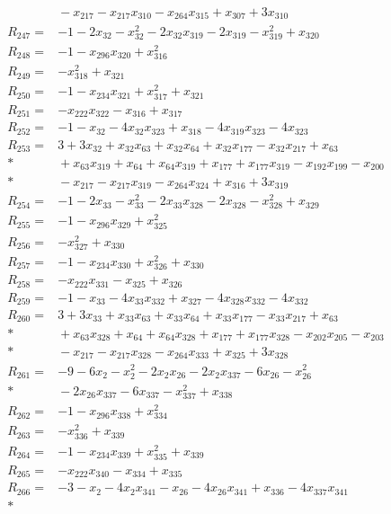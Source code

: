 \begin{align*}
&{}-x_{217}-x_{217}x_{310}-x_{264}x_{315}+x_{307}+3x_{310}\\[3pt]
R_{247}={}&-1-2x_{32}-x_{32}^{2}-2x_{32}x_{319}-2x_{319}-x_{319}^{2}+x_{320}\\[3pt]
R_{248}={}&-1-x_{296}x_{320}+x_{316}^{2}\\[3pt]
R_{249}={}&-x_{318}^{2}+x_{321}\\[3pt]
R_{250}={}&-1-x_{234}x_{321}+x_{317}^{2}+x_{321}\\[3pt]
R_{251}={}&-x_{222}x_{322}-x_{316}+x_{317}\\[3pt]
R_{252}={}&-1-x_{32}-4x_{32}x_{323}+x_{318}-4x_{319}x_{323}-4x_{323}\\[3pt]
R_{253}={}&3+3x_{32}+x_{32}x_{63}+x_{32}x_{64}+x_{32}x_{177}-x_{32}x_{217}+x_{63}\\*
&{}+x_{63}x_{319}+x_{64}+x_{64}x_{319}+x_{177}+x_{177}x_{319}-x_{192}x_{199}-x_{200}\\*
&{}-x_{217}-x_{217}x_{319}-x_{264}x_{324}+x_{316}+3x_{319}\\[3pt]
R_{254}={}&-1-2x_{33}-x_{33}^{2}-2x_{33}x_{328}-2x_{328}-x_{328}^{2}+x_{329}\\[3pt]
R_{255}={}&-1-x_{296}x_{329}+x_{325}^{2}\\[3pt]
R_{256}={}&-x_{327}^{2}+x_{330}\\[3pt]
R_{257}={}&-1-x_{234}x_{330}+x_{326}^{2}+x_{330}\\[3pt]
R_{258}={}&-x_{222}x_{331}-x_{325}+x_{326}\\[3pt]
R_{259}={}&-1-x_{33}-4x_{33}x_{332}+x_{327}-4x_{328}x_{332}-4x_{332}\\[3pt]
R_{260}={}&3+3x_{33}+x_{33}x_{63}+x_{33}x_{64}+x_{33}x_{177}-x_{33}x_{217}+x_{63}\\*
&{}+x_{63}x_{328}+x_{64}+x_{64}x_{328}+x_{177}+x_{177}x_{328}-x_{202}x_{205}-x_{203}\\*
&{}-x_{217}-x_{217}x_{328}-x_{264}x_{333}+x_{325}+3x_{328}\\[3pt]
R_{261}={}&-9-6x_{2}-x_{2}^{2}-2x_{2}x_{26}-2x_{2}x_{337}-6x_{26}-x_{26}^{2}\\*
&{}-2x_{26}x_{337}-6x_{337}-x_{337}^{2}+x_{338}\\[3pt]
R_{262}={}&-1-x_{296}x_{338}+x_{334}^{2}\\[3pt]
R_{263}={}&-x_{336}^{2}+x_{339}\\[3pt]
R_{264}={}&-1-x_{234}x_{339}+x_{335}^{2}+x_{339}\\[3pt]
R_{265}={}&-x_{222}x_{340}-x_{334}+x_{335}\\[3pt]
R_{266}={}&-3-x_{2}-4x_{2}x_{341}-x_{26}-4x_{26}x_{341}+x_{336}-4x_{337}x_{341}\\*

\end{align*}
